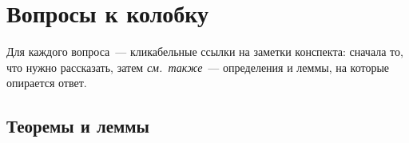 \chapter{Вопросы к колобку}\label{app:bilety}

\noindent Для каждого вопроса~--- кликабельные ссылки на заметки конспекта: сначала
то, что нужно рассказать, затем \emph{см.\ также}~--- определения и леммы, на
которые опирается ответ.

\begingroup
{}\sloppy
\section*{Теоремы и леммы}\label{app:bilety:thm}
